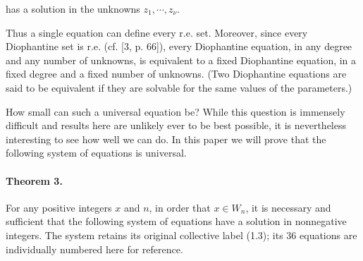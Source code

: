 \documentclass[11pt,a4paper]{article}
\begin{document}
has a solution in the unknowns $z_{1}, \cdots, z_{\nu}$.


Thus a single equation can define every r.e. set. Moreover, since every Diophantine set is r.e. (cf. [3, p. 66]), every Diophantine equation, in any degree and any number of unknowns, is equivalent to a fixed Diophantine equation, in a fixed degree and a fixed number of unknowns. (Two Diophantine equations are said to be equivalent if they are solvable for the same values of the parameters.)

How small can such a universal equation be? While this question is immensely difficult and results here are unlikely ever to be best possible, it is nevertheless interesting to see how well we can do. In this paper we will prove that the following system of equations is universal.

\paragraph{Theorem 3.}
For any positive integers $x$ and $n$, in order that $x\in W_n$, it is necessary
and sufficient that the following system of equations have a solution in
nonnegative integers. The system retains its original collective label (1.3);
its 36 equations are individually numbered here for reference.
\end{document}

